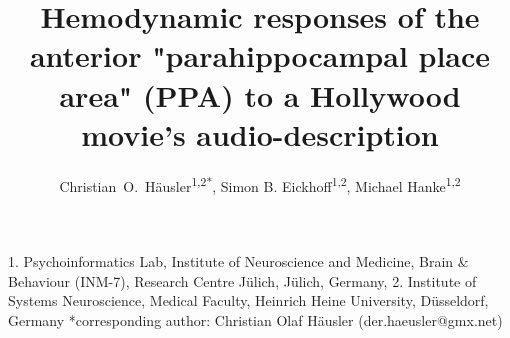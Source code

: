 \documentclass[english]{article}
\begin{document}




\title{Hemodynamic responses of the anterior "parahippocampal place area" (PPA) to a Hollywood movie's audio-description}

\author{
    Christian~O.~Häusler\textsuperscript{1,2{*}},
    Simon B. Eickhoff\textsuperscript{1,2},
    Michael Hanke\textsuperscript{1,2}}

\maketitle
\thispagestyle{fancy}

1. Psychoinformatics Lab, Institute of Neuroscience and Medicine, Brain \&
Behaviour (INM-7), Research Centre Jülich, Jülich, Germany, 2. Institute of
Systems Neuroscience, Medical Faculty, Heinrich Heine University,  Düsseldorf,
Germany {*}corresponding author: Christian Olaf Häusler (der.haeusler@gmx.net)

\end{document}

